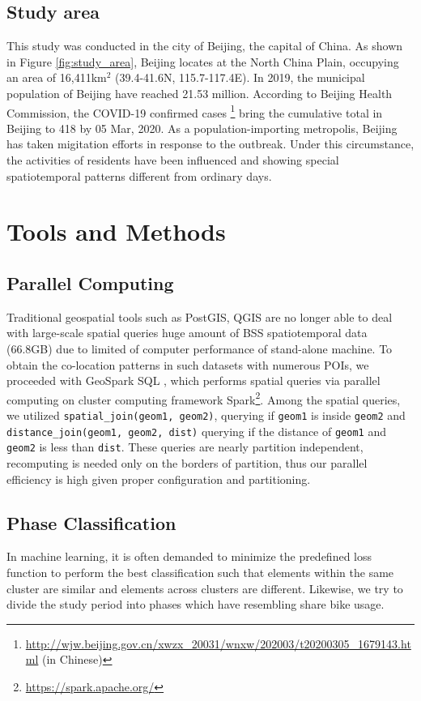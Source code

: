 \documentclass[ijgi,submit,moreauthors,pdftex]{Definitions/mdpi}
\begin{document}
\subsection{Study area}
This study was conducted in the city of Beijing, the capital of China.
As shown in Figure \ref{fig:study_area}, Beijing locates at the North China Plain, occupying an area of 16,411km$^2$ (39.4{\degree}-41.6{\degree}N, 115.7{\degree}-117.4{\degree}E).
In 2019, the municipal population of Beijing have reached 21.53 million. According to Beijing Health Commission, the COVID-19 confirmed cases \footnote{\url{http://wjw.beijing.gov.cn/xwzx_20031/wnxw/202003/t20200305_1679143.html} (in Chinese)} bring the cumulative total in Beijing to 418 by 05 Mar, 2020.
As a population-importing metropolis, Beijing has taken migitation efforts in response to the outbreak. 
Under this circumstance, the activities of residents have been influenced and showing special spatiotemporal patterns different from ordinary days.

\section{Tools and Methods}

\subsection{Parallel Computing}
Traditional geospatial tools such as PostGIS, QGIS are no longer able to deal with large-scale spatial queries huge amount of BSS spatiotemporal data (66.8GB) due to limited of computer performance of stand-alone machine.
To obtain the co-location patterns in such datasets with numerous POIs, we proceeded with GeoSpark SQL \cite{huang2017geospark}, which performs spatial queries via parallel computing on cluster computing framework Spark\footnote{\url{https://spark.apache.org/}}.
Among the spatial queries, we utilized \texttt{spatial\_join(geom1, geom2)}, querying if \texttt{geom1} is inside \texttt{geom2} and \texttt{distance\_join(geom1, geom2, dist)} querying if the distance of \texttt{geom1} and \texttt{geom2} is less than \texttt{dist}.
These queries are nearly partition independent, recomputing is needed only on the borders of partition, thus our parallel efficiency is high given proper configuration and partitioning.

\subsection{Phase Classification}\label{sec:phase_classification}
In machine learning, it is often demanded to minimize the predefined loss function to perform the best classification such that elements within the same cluster are similar and elements across clusters are different.
Likewise, we try to divide the study period into phases which have resembling share bike usage.
\end{document}
